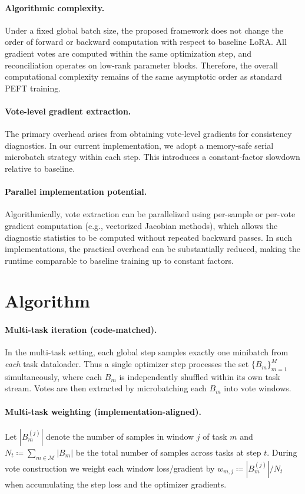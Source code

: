 \documentclass{article}
\begin{document}
\paragraph{Algorithmic complexity.}
Under a fixed global batch size,
the proposed framework does not change the order of forward or backward
computation with respect to baseline LoRA.
All gradient votes are computed within the same optimization step,
and reconciliation operates on low-rank parameter blocks.
Therefore, the overall computational complexity
remains of the same asymptotic order as standard PEFT training.

\paragraph{Vote-level gradient extraction.}
The primary overhead arises from obtaining vote-level gradients
for consistency diagnostics.
In our current implementation, we adopt a memory-safe
serial microbatch strategy within each step.
This introduces a constant-factor slowdown relative to baseline.

\paragraph{Parallel implementation potential.}
Algorithmically, vote extraction can be parallelized
using per-sample or per-vote gradient computation (e.g., vectorized Jacobian methods),
which allows the diagnostic statistics to be computed
without repeated backward passes.
In such implementations, the practical overhead can be substantially reduced,
making the runtime comparable to baseline training up to constant factors.


\section{Algorithm}

\paragraph{Multi-task iteration (code-matched).}
In the multi-task setting, each global step samples exactly one minibatch from \emph{each} task dataloader.
Thus a single optimizer step processes the set $\{B_m\}_{m=1}^{M}$ simultaneously, where each $B_m$
is independently shuffled within its own task stream.
Votes are then extracted by microbatching each $B_m$ into vote windows.

\paragraph{Multi-task weighting (implementation-aligned).}
Let $|B_m^{(j)}|$ denote the number of samples in window $j$ of task $m$ and $N_t \coloneqq \sum_{m\in\mathcal{M}} |B_m|$ be the total number of samples across tasks at step $t$.
During vote construction we weight each window loss/gradient by $w_{m,j} \coloneqq |B_m^{(j)}|/N_t$ when accumulating the step loss and the optimizer gradients.
\end{document}
